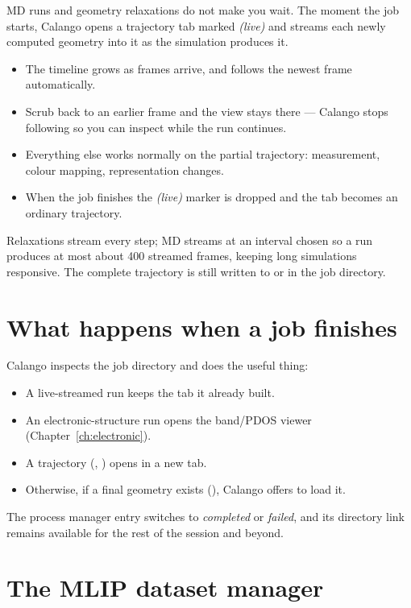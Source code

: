MD runs and geometry relaxations do not make you wait. The moment the job
starts, Calango opens a trajectory tab marked \emph{(live)} and streams
each newly computed geometry into it as the simulation produces it.

\begin{itemize}
  \item The timeline grows as frames arrive, and follows the newest frame
    automatically.
  \item Scrub back to an earlier frame and the view stays there --- Calango
    stops following so you can inspect while the run continues.
  \item Everything else works normally on the partial trajectory:
    measurement, colour mapping, representation changes.
  \item When the job finishes the \emph{(live)} marker is dropped and the
    tab becomes an ordinary trajectory.
\end{itemize}

Relaxations stream every step; MD streams at an interval chosen so a run
produces at most about 400 streamed frames, keeping long simulations
responsive. The complete trajectory is still written to
 or  in the job directory.

\section{What happens when a job finishes}

Calango inspects the job directory and does the useful thing:

\begin{itemize}
  \item A live-streamed run keeps the tab it already built.
  \item An electronic-structure run opens the band/PDOS viewer
    (Chapter~\ref{ch:electronic}).
  \item A trajectory (, ) opens in a new tab.
  \item Otherwise, if a final geometry exists
    (), Calango offers to load it.
\end{itemize}

The process manager entry switches to \emph{completed} or \emph{failed},
and its directory link remains available for the rest of the session and
beyond.

\section{The MLIP dataset manager}
\label{sec:dataset-manager}

